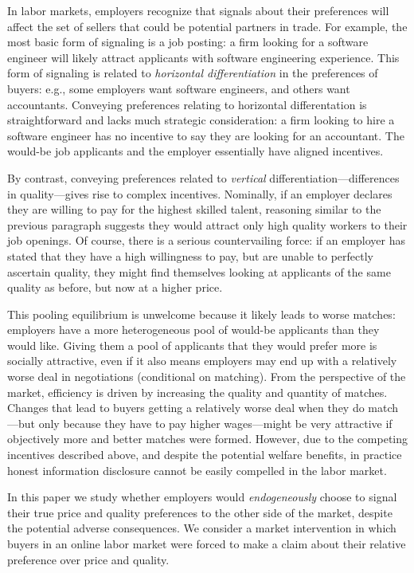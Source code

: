 
In labor markets, employers recognize that signals about their preferences will affect the set of sellers that could be potential partners in trade.
For example, the most basic form of signaling is a job posting:
a firm looking for a software engineer will likely attract applicants with software engineering experience.
This form of signaling is related to {\em horizontal differentiation} in the preferences of buyers:
e.g., some employers want software engineers, and others want accountants.
Conveying preferences relating to horizontal differentation is straightforward and lacks much strategic consideration:
a firm looking to hire a software engineer has no incentive to say they are looking for an accountant.
The would-be job applicants and the employer essentially have aligned incentives.

By contrast, conveying preferences related to {\em vertical} differentiation---differences in quality---gives rise to complex incentives.
Nominally, if an employer declares they are willing to pay for the highest skilled talent, reasoning similar to the previous paragraph suggests they would attract only high quality workers to their job openings.
Of course, there is a serious countervailing force:
if an employer has stated that they have a high willingness to pay, but are unable to perfectly ascertain quality, they might find themselves looking at applicants of the same quality as before, but now at a higher price.


This pooling equilibrium is unwelcome because it likely leads to worse matches: 
employers have a more heterogeneous pool of would-be applicants than they would like. 
Giving them a pool of applicants that they would prefer more is socially attractive, even if it also means employers may end up with a relatively worse deal in negotiations (conditional on matching).
From the perspective of the market, efficiency is driven by increasing the quality and quantity of matches.
Changes that lead to buyers getting a relatively worse deal when they do match---but only because they have to pay higher wages---might be very attractive if objectively more and better matches were formed.
However, due to the competing incentives described above, and despite the potential welfare benefits, in practice honest information disclosure cannot be easily compelled in the labor market.

In this paper we study whether employers would {\em endogeneously} choose to signal their true price and quality preferences to the other side of the market, despite the potential adverse consequences.
We consider a market intervention in which buyers in an online labor market were forced to make a claim about their relative preference over price and quality. 



